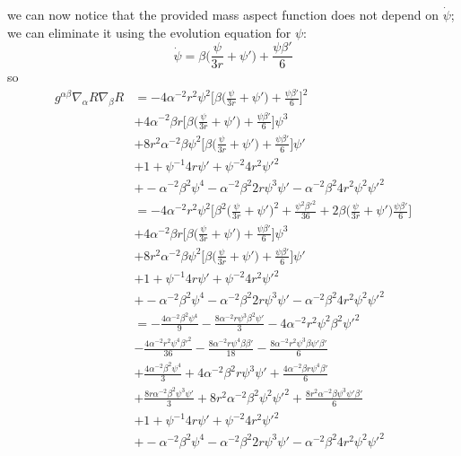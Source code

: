\documentclass[12pt]{article}
\numberwithin{equation}{section}
\begin{document}
we can now notice that the provided mass aspect function does not depend on $\dot{\psi}$; we can eliminate it using the evolution equation for $\psi$:
\begin{equation*}
\dot{\psi} = \beta \Big( \frac{\psi}{3 r} + \psi' \Big) + \frac{\psi \beta'}{6}
\end{equation*}
so
\begin{equation}
\begin{aligned}
g^{\alpha \beta} \nabla_\alpha R \nabla_\beta R &= -4 \alpha^{-2} r^2 \psi^2 \Big[ \beta \Big( \frac{\psi}{3 r} + \psi' \Big) + \frac{\psi \beta'}{6} \Big]^2 \\
&+ 4 \alpha^{-2} \beta r \Big[ \beta \Big( \frac{\psi}{3 r} + \psi' \Big) + \frac{\psi \beta'}{6} \Big] \psi^3 \\
&+ 8 r^2 \alpha^{-2} \beta \psi^2 \Big[ \beta \Big( \frac{\psi}{3 r} + \psi' \Big) + \frac{\psi \beta'}{6} \Big] \psi' \\
&+ 1 + \psi^{-1} 4 r \psi' + \psi^{-2} 4 r^2 \psi'^2 \\
&+ -\alpha^{-2} \beta^2 \psi^4 - \alpha^{-2} \beta^2 2 r \psi^3 \psi' - \alpha^{-2} \beta^2 4 r^2 \psi^2 \psi'^2 \\
&= -4 \alpha^{-2} r^2 \psi^2 \Big[ \beta^2 \Big( \frac{\psi}{3 r} + \psi' \Big)^2 + \frac{\psi^2 \beta'^2}{36} + 2 \beta \Big(\frac{\psi}{3r} + \psi'\Big) \frac{\psi \beta'}{6} \Big] \\
&+ 4 \alpha^{-2} \beta r \Big[ \beta \Big( \frac{\psi}{3 r} + \psi' \Big) + \frac{\psi \beta'}{6} \Big] \psi^3 \\
&+ 8 r^2 \alpha^{-2} \beta \psi^2 \Big[ \beta \Big( \frac{\psi}{3 r} + \psi' \Big) + \frac{\psi \beta'}{6} \Big] \psi' \\
&+ 1 + \psi^{-1} 4 r \psi' + \psi^{-2} 4 r^2 \psi'^2 \\
&+ -\alpha^{-2} \beta^2 \psi^4 - \alpha^{-2} \beta^2 2 r \psi^3 \psi' - \alpha^{-2} \beta^2 4 r^2 \psi^2 \psi'^2 \\
&= - \frac{4 \alpha^{-2} \beta^2 \psi^4}{9} - \frac{8 \alpha^{-2} r \psi^3 \beta^2  \psi'}{3} - 4 \alpha^{-2} r^2 \psi^2 \beta^2 \psi'^2  \\
&- \frac{4 \alpha^{-2} r^2 \psi^4 \beta'^2}{36} - \frac{8 \alpha^{-2} r \psi^4 \beta \beta'}{18} - \frac{8 \alpha^{-2} r^2 \psi^3 \beta \psi' \beta'}{6} \\
&+ \frac{4 \alpha^{-2} \beta^2 \psi^4}{3} + 4 \alpha^{-2} \beta^2 r \psi^3 \psi' + \frac{4 \alpha^{-2} \beta r \psi^4 \beta'}{6}   \\
&+ \frac{8 r \alpha^{-2} \beta^2 \psi^3 \psi'}{3} + 8 r^2 \alpha^{-2} \beta^2 \psi^2 \psi'^2 + \frac{8 r^2 \alpha^{-2} \beta \psi^3 \psi' \beta'}{6} \\
&+ 1 + \psi^{-1} 4 r \psi' + \psi^{-2} 4 r^2 \psi'^2 \\
&+ -\alpha^{-2} \beta^2 \psi^4 - \alpha^{-2} \beta^2 2 r \psi^3 \psi' - \alpha^{-2} \beta^2 4 r^2 \psi^2 \psi'^2 \\
\end{aligned}
\end{equation}
\end{document}
